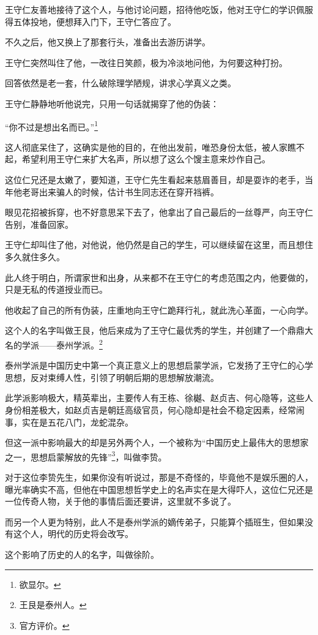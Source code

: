 \begin{multicols}{\theparacolNo}
王守仁友善地接待了这个人，与他讨论问题，招待他吃饭，他对王守仁的学识佩服得五体投地，便想拜入门下，王守仁答应了。

不久之后，他又换上了那套行头，准备出去游历讲学。

王守仁突然叫住了他，一改往日笑颜，极为冷淡地问他，为何要这种打扮。

回答依然是老一套，什么破除理学陋规，讲求心学真义之类。

王守仁静静地听他说完，只用一句话就揭穿了他的伪装：

“你不过是想出名而已。”\footnote{欲显尔。}

这人彻底呆住了，这确实是他的目的，在他出发前，唯恐身份太低，被人家瞧不起，希望利用王守仁来扩大名声，所以想了这么个馊主意来炒作自己。

这位仁兄还是太嫩了，要知道，王守仁先生看起来慈眉善目，却是耍诈的老手，当年他老哥出来骗人的时候，估计书生同志还在穿开裆裤。

眼见花招被拆穿，也不好意思呆下去了，他拿出了自己最后的一丝尊严，向王守仁告别，准备回家。

王守仁却叫住了他，对他说，他仍然是自己的学生，可以继续留在这里，而且想住多久就住多久。

此人终于明白，所谓家世和出身，从来都不在王守仁的考虑范围之内，他要做的，只是无私的传道授业而已。

他收起了自己的所有伪装，庄重地向王守仁跪拜行礼，就此洗心革面，一心向学。

这个人的名字叫做王艮，他后来成为了王守仁最优秀的学生，并创建了一个鼎鼎大名的学派——泰州学派。\footnote{王艮是泰州人。}

泰州学派是中国历史中第一个真正意义上的思想启蒙学派，它发扬了王守仁的心学思想，反对束缚人性，引领了明朝后期的思想解放潮流。

此学派影响极大，精英辈出，主要传人有王栋、徐樾、赵贞吉、何心隐等，这些人身份相差极大，如赵贞吉是朝廷高级官员，何心隐却是社会不稳定因素，经常闹事，实在是五花八门，龙蛇混杂。

但这一派中影响最大的却是另外两个人，一个被称为“中国历史上最伟大的思想家之一，思想启蒙解放的先锋”\footnote{官方评价。}，叫做李贽。

对于这位李贽先生，如果你没有听说过，那是不奇怪的，毕竟他不是娱乐圈的人，曝光率确实不高，但他在中国思想哲学史上的名声实在是大得吓人，这位仁兄还是一位传奇人物，关于他的事情后面还要讲，这里就不多说了。

而另一个人更为特别，此人不是泰州学派的嫡传弟子，只能算个插班生，但如果没有这个人，明代的历史将会改写。

这个影响了历史的人的名字，叫做徐阶。


\end{multicols}
